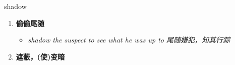 
\begin{frame}
{\huge shadow}
\begin{center}
\begin{enumerate}\Large
  \item \textbf{偷偷尾随}
  \begin{itemize}
    \item \em{\Large{shadow the suspect to see what he was up to 尾随嫌犯，知其行踪}}
  \end{itemize}
  \item \textbf{遮蔽，(使)变暗}
\end{enumerate}
\end{center}
\end{frame}
